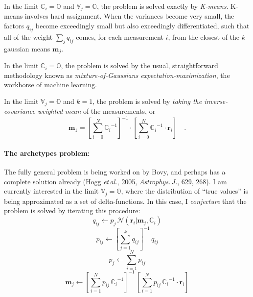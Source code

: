\documentclass[12pt]{article}
\newcommand{\etal}{\emph{et\,al.}}
\newcommand{\ApJ}{\emph{Astrophys.\,J.}}
\newcommand{\Mvector}[1]{\boldsymbol{#1}}
\newcommand{\measurement}{\Mvector{r}}
\newcommand{\measurementi}{\measurement_i}
\newcommand{\mean}{\Mvector{m}}
\newcommand{\meanj}{\mean_j}
\newcommand{\gaussian}{\mathcal{N}\!}
\newcommand{\ampj}{p_j}
\newcommand{\ampij}{q_{ij}}
\newcommand{\normampij}{p_{ij}}
\newcommand{\Mmatrix}[1]{\mathbb{#1}}
\newcommand{\varj}{\Mmatrix{V}_j}
\newcommand{\covari}{\Mmatrix{C}_i}
\newcommand{\zero}{\Mmatrix{O}}
\newcommand{\inverse}[1]{{#1}^{-1}}
\newcommand{\invcovari}{\inverse{\covari}}
\begin{document}
In the limit $\covari=\zero$ and $\varj=\zero$, the problem is solved
exactly by \emph{K-means}.  K-means involves hard assignment.  When
the variances become very small, the factors $\ampij$ become
exceedingly small but also exceedingly differentiated, such that all
of the weight $\sum_j\ampij$ comes, for each measurement $i$, from the
closest of the $k$ gaussian means $\meanj$.

In the limit $\covari=\zero$, the problem is solved by the usual,
straightforward methodology known as \emph{mixture-of-Gaussians
expectation-maximization}, the workhorse of machine learning.

In the limit $\varj=\zero$ and $k=1$, the problem is solved by
\emph{taking the inverse-covariance-weighted mean} of the
measurements, or
\begin{equation}
\mean_1 = \inverse{\left[
  \sum_{i=0}^N \invcovari
\right]}\cdot\left[
  \sum_{i=0}^N \invcovari\cdot\measurementi
\right]
\quad .
\end{equation}

\paragraph{The archetypes problem:}
The fully general problem is being worked on by Bovy, and perhaps has
a complete solution already (Hogg \etal, 2005, \ApJ, 629, 268).  I am
currently interested in the limit $\varj=\zero$, where the
distribution of ``true values'' is being approximated as a set of
delta-functions.  In this case, I \emph{conjecture} that the problem
is solved by iterating this procedure:
\begin{equation}
\ampij \leftarrow \ampj\,\gaussian(\measurementi|\meanj,\covari)
\end{equation}
\begin{equation}
\normampij \leftarrow \inverse{\left[
  \sum_{j=1}^k\ampij
\right]}\,\ampij
\end{equation}
\begin{equation}
\ampj \leftarrow \sum_{i=1}^N\normampij
\end{equation}
\begin{equation}
\meanj \leftarrow \inverse{\left[
  \sum_{i=1}^N\normampij\,\invcovari
\right]}\,\left[
  \sum_{i=1}^N\normampij\,\invcovari\cdot\measurementi
\right]
\end{equation}
\end{document}
